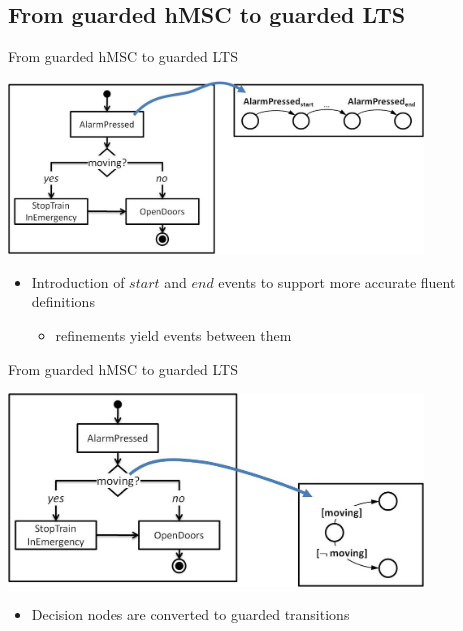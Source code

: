 \subsection{From guarded hMSC to guarded LTS}
\begin{frame}{From guarded hMSC to guarded LTS}

  \begin{center}
    \includegraphics[width=11cm]{images/ghmsc2glts_task.jpg}
  \end{center}
  
  \begin{itemize}
    \item Introduction of $start$ and $end$ events to support more accurate fluent definitions
    \begin{itemize}
      \item refinements yield events between them
    \end{itemize}
  \end{itemize}

\end{frame}


\begin{frame}{From guarded hMSC to guarded LTS}

  \begin{center}
    \includegraphics[width=11cm]{images/ghmsc2glts_decision.jpg}
  \end{center}
  
  \begin{itemize}
    \item Decision nodes are converted to guarded transitions
  \end{itemize}

\end{frame}

